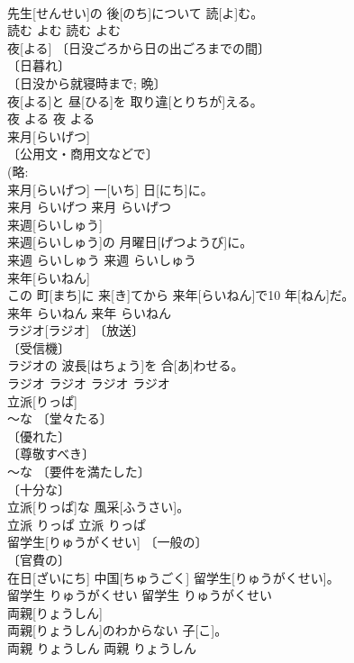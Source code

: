 \documentclass[8pt]{extreport}
\begin{document}
\begin{CJK}{UTF8}{min}
\\	先生[せんせい]の 後[のち]について 読[よ]む。	
\\	読む	よむ	読む	よむ	
\\	夜[よる]	〔日没ごろから日の出ごろまでの間〕 
\\	〔日暮れ〕 
\\	〔日没から就寝時まで; 晩〕 
\\	[＝よ４]	夜[よる]と 昼[ひる]を 取り違[とりちが]える。	
\\	夜	よる	夜	よる	
\\	来月[らいげつ]	
\\	〔公用文・商用文などで〕 
\\	(略: 
\\	来月[らいげつ] 一[いち] 日[にち]に。	
\\	来月	らいげつ	来月	らいげつ	
\\	来週[らいしゅう]	
\\	来週[らいしゅう]の 月曜日[げつようび]に。	
\\	来週	らいしゅう	来週	らいしゅう	
\\	来年[らいねん]	
\\	この 町[まち]に 来[き]てから 来年[らいねん]で10 年[ねん]だ。	
\\	来年	らいねん	来年	らいねん	
\\	ラジオ[ラジオ]	〔放送〕 
\\	〔受信機〕 
\\	ラジオの 波長[はちょう]を 合[あ]わせる。	
\\	ラジオ	ラジオ	ラジオ	ラジオ	
\\	立派[りっぱ]	
\\	～な 〔堂々たる〕 
\\	〔優れた〕 
\\	〔尊敬すべき〕 
\\	～な 〔要件を満たした〕 
\\	〔十分な〕 
\\	立派[りっぱ]な 風采[ふうさい]。	
\\	立派	りっぱ	立派	りっぱ	
\\	留学生[りゅうがくせい]	〔一般の〕 
\\	〔官費の〕 
\\	在日[ざいにち] 中国[ちゅうごく] 留学生[りゅうがくせい]。	
\\	留学生	りゅうがくせい	留学生	りゅうがくせい	
\\	両親[りょうしん]	
\\	両親[りょうしん]のわからない 子[こ]。	
\\	両親	りょうしん	両親	りょうしん	

\end{CJK}
\end{document}
